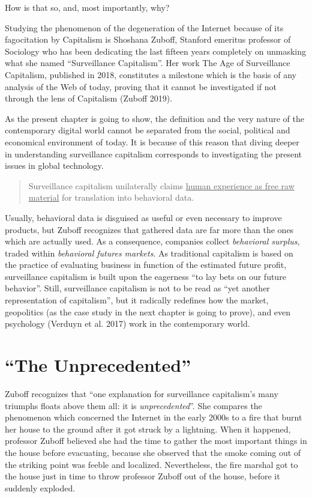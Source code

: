 \documentclass[
  a4paper,
]{book}
\begin{document}
How is that so, and, most importantly, why?

Studying the phenomenon of the degeneration of the Internet because of its fagocitation by Capitalism is Shoshana Zuboff, Stanford emeritus professor of Sociology who has been dedicating the last fifteen years completely on unmasking what she named ``Surveillance Capitalism''. Her work The Age of Surveillance Capitalism, published in 2018, constitutes a milestone which is the basis of any analysis of the Web of today, proving that it cannot be investigated if not through the lens of Capitalism {(Zuboff 2019)}.

As the present chapter is going to show, the definition and the very nature of the contemporary digital world cannot be separated from the social, political and economical environment of today. It is because of this reason that diving deeper in understanding surveillance capitalism corresponds to investigating the present issues in global technology.

\begin{quote}
Surveillance capitalism unilaterally claims \uline{human experience as free raw material} for translation into behavioral data.
\end{quote}

Usually, behavioral data is disguised as useful or even necessary to improve products, but Zuboff recognizes that gathered data are far more than the ones which are actually used. As a consequence, companies collect \emph{behavioral surplus}, traded within \emph{behavioral futures markets}. As traditional capitalism is based on the practice of evaluating business in function of the estimated future profit, surveillance capitalism is built upon the eagerness ``to lay bets on our future behavior''. Still, surveillance capitalism is not to be read as ``yet another representation of capitalism'', but it radically redefines how the market, geopolitics (as the case study in the next chapter is going to prove), and even psychology {(Verduyn et al. 2017)} work in the contemporary world.

\hypertarget{the-unprecedented}{%
\section{``The Unprecedented''}\label{the-unprecedented}}

Zuboff recognizes that ``one explanation for surveillance capitalism's many triumphs floats above them all: it is \emph{unprecedented}''. She compares the phenomenon which concerned the Internet in the early 2000s to a fire that burnt her house to the ground after it got struck by a lightning. When it happened, professor Zuboff believed she had the time to gather the most important things in the house before evacuating, because she observed that the smoke coming out of the striking point was feeble and localized. Nevertheless, the fire marshal got to the house just in time to throw professor Zuboff out of the house, before it suddenly exploded.
\end{document}
